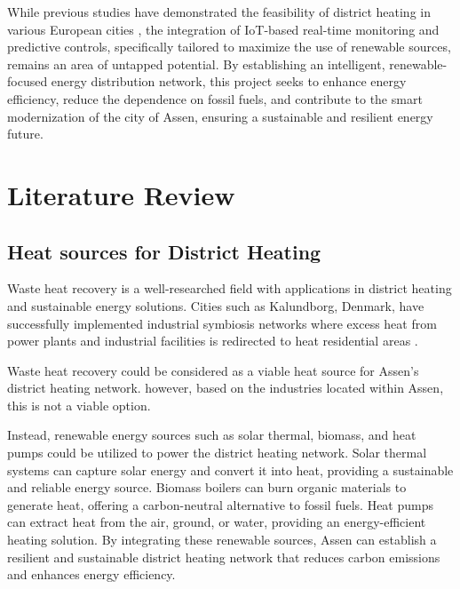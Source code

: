 \documentclass{article}
\begin{document}
While previous studies have demonstrated the feasibility of district heating in various European cities \cite{kalundborg}, the integration of IoT-based real-time monitoring and predictive controls, specifically tailored to maximize the use of renewable sources, remains an area of untapped potential. By establishing an intelligent, renewable-focused energy distribution network, this project seeks to enhance energy efficiency, reduce the dependence on fossil fuels, and contribute to the smart modernization of the city of Assen, ensuring a sustainable and resilient energy future.

\section{Literature Review}
\subsection{Heat sources for District Heating}
Waste heat recovery is a well-researched field with applications in district heating and sustainable energy solutions. Cities such as Kalundborg, Denmark, have successfully implemented industrial symbiosis networks where excess heat from power plants and industrial facilities is redirected to heat residential areas \cite{kalundborg}.

Waste heat recovery could be considered as a viable heat source for Assen's district heating network. however, based on the industries located within Assen\cite{bedrijvenopdekaart_assen}, this is not a viable option.

Instead, renewable energy sources such as solar thermal, biomass, and heat pumps could be utilized to power the district heating network\cite{nationaal_programma_duurzame}. Solar thermal systems can capture solar energy and convert it into heat, providing a sustainable and reliable energy source. Biomass boilers can burn organic materials to generate heat, offering a carbon-neutral alternative to fossil fuels. Heat pumps can extract heat from the air, ground, or water, providing an energy-efficient heating solution. By integrating these renewable sources, Assen can establish a resilient and sustainable district heating network that reduces carbon emissions and enhances energy efficiency.
\end{document}
